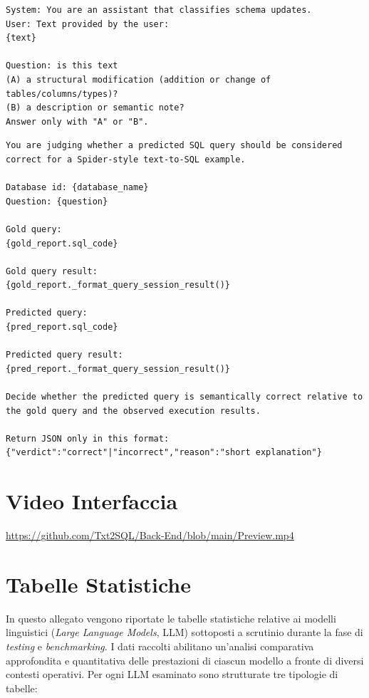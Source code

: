 \begin{lstlisting}[basicstyle=\ttfamily\footnotesize, frame=single, breaklines=true, caption={Struttura del prompt \text{update\_classification\_prompt}.}, label={lst:prompt_classification}]
System: You are an assistant that classifies schema updates.
User: Text provided by the user:
{text}

Question: is this text
(A) a structural modification (addition or change of tables/columns/types)?
(B) a description or semantic note?
Answer only with "A" or "B".
\end{lstlisting}

\begin{lstlisting}[basicstyle=\ttfamily\footnotesize, frame=single, breaklines=true, caption={Struttura del prompt \texttt{llm\_judge\_prompt}.}, label={lst:prompt_judge}]
You are judging whether a predicted SQL query should be considered correct for a Spider-style text-to-SQL example.

Database id: {database_name}
Question: {question}

Gold query:
{gold_report.sql_code}

Gold query result:
{gold_report._format_query_session_result()}

Predicted query:
{pred_report.sql_code}

Predicted query result:
{pred_report._format_query_session_result()}

Decide whether the predicted query is semantically correct relative to the gold query and the observed execution results.

Return JSON only in this format:
{"verdict":"correct"|"incorrect","reason":"short explanation"}
\end{lstlisting}

\chapter{Video Interfaccia}

\url{https://github.com/Txt2SQL/Back-End/blob/main/Preview.mp4}

\chapter{Tabelle Statistiche}
\label{app:tables}

In questo allegato vengono riportate le tabelle statistiche relative ai modelli linguistici (\textit{Large Language Models}, LLM) sottoposti a scrutinio durante la fase di \textit{testing} e \textit{benchmarking}. I dati raccolti abilitano un'analisi comparativa approfondita e quantitativa delle prestazioni di ciascun modello a fronte di diversi contesti operativi. Per ogni LLM esaminato sono strutturate tre tipologie di tabelle:

